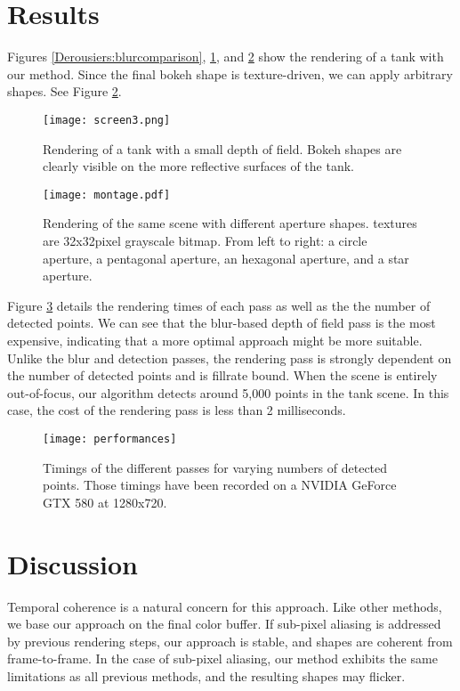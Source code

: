 \section{Results}
Figures \ref{Derousiers:blurcomparison}, \ref{Derousiers:bokehrendering}, and \ref{Derousiers:bokehcomparison} show the rendering of a tank with our method. Since the final bokeh shape is texture-driven, we can apply arbitrary shapes. See Figure \ref{Derousiers:bokehcomparison}.

	\begin{figure}[htb]\centering
	\texttt{[image: screen3.png]}
	\caption{Rendering of a tank with a small depth of field. Bokeh shapes are clearly visible on the more reflective surfaces of the tank.}
	\label{Derousiers:bokehrendering}
	\end{figure}

	\begin{figure}[htb]\centering
	\texttt{[image: montage.pdf]}
	\caption{Rendering of the same scene with different aperture shapes. \Bokeh textures are 32x32pixel grayscale bitmap. From left to right: a circle aperture, a pentagonal aperture, an hexagonal aperture, and a star aperture.}
	\label{Derousiers:bokehcomparison}
	\end{figure}

Figure \ref{Derousiers:performance} details the rendering times of each pass as well as the the number of detected \bokeh points. We can see that the blur-based depth of field pass is the most expensive, indicating that a more optimal approach might be more suitable. Unlike the blur and detection passes, the rendering pass is strongly dependent on the number of detected \bokeh points and is fillrate bound. When the scene is entirely out-of-focus, our algorithm detects around 5,000 \bokeh points in the tank scene. In this case, the cost of the rendering pass is less than 2 milliseconds.

	\begin{figure}[htb]\centering
	\texttt{[image: performances]}
	\caption{Timings of the different passes for varying numbers of detected \bokeh points. Those timings have been recorded on a NVIDIA GeForce GTX 580 at 1280x720. }
	\label{Derousiers:performance}
	\end{figure}

\section{Discussion}
Temporal coherence is a natural concern for this approach. Like other methods, we base our approach on the final color buffer. If sub-pixel aliasing is addressed by previous rendering steps, our approach is stable, and \bokeh shapes are coherent from frame-to-frame. In the case of sub-pixel aliasing, our method exhibits the same limitations as all previous methods, and the resulting \bokeh shapes may flicker.

